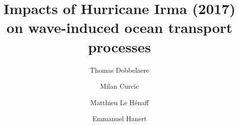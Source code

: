 \documentclass[preprint,12pt,authoryear]{elsarticle}
\begin{document}
\begin{frontmatter}



    \title{Impacts of Hurricane Irma (2017) on wave-induced ocean transport processes}%


    \author[eli]{Thomas Dobbelaere}
    \author[rsmas]{Milan Curcic}
    \author[cimas,aoml]{Matthieu Le H\'enaff}
    \author[eli,immc]{Emmanuel Hanert}


\end{frontmatter}
\end{document}
